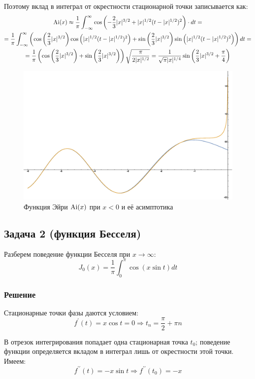 \documentclass[a4paper,12pt]{article}
\begin{document}
\noindent
Поэтому вклад в интеграл от окрестности стационарной точки записывается
как:
\begin{multline*}
{\rm Ai}(x)\approx\frac{1}{\pi}\int_{-\infty}^{\infty}\cos\left(-\frac{2}{3}|x|^{3/2}+|x|^{1/2}(t-|x|^{1/2})^{2}\right)\cdot dt=\\
=\frac{1}{\pi}\int_{-\infty}^{\infty}\left(\cos\left(\frac{2}{3}|x|^{3/2}\right)\cos\left(|x|^{1/2}(t-|x|^{1/2})^{2}\right)+\sin\left(\frac{2}{3}|x|^{3/2}\right)\sin\left(|x|^{1/2}(t-|x|^{1/2})^{2}\right)\right)dt=\\
=\frac{1}{\pi}\left(\cos\left(\frac{2}{3}|x|^{3/2}\right)+\sin\left(\frac{2}{3}|x|^{3/2}\right)\right)\sqrt{\frac{\pi}{2|x|^{1/2}}}=\frac{1}{\sqrt{\pi}|x|^{1/4}}\sin\left(\frac{2}{3}|x|^{3/2}+\frac{\pi}{4}\right)
\end{multline*}


\begin{figure}[h]
\caption{Функция Эйри ${\rm Ai}(x)$ при $x<0$ и её асимптотика}
\centering
\includegraphics[width=0.65\columnwidth]{airy.eps}
\end{figure}



\subsection*{Задача 2 (функция Бесселя)}

Разберем поведение функции Бесселя при $x\to\infty$:
\[
J_{0}(x)=\frac{1}{\pi}\int_{0}^{\pi}\cos(x\sin t)dt
\]



\subsubsection*{Решение}

Стационарные точки фазы даются условием:
\[
f^{\prime}(t)=x\cos t=0\Rightarrow t_{n}=\frac{\pi}{2}+\pi n
\]

\noindent
В отрезок интегрирования попадает одна стационарная точка $t_{0}$;
поведение функции определяется вкладом в интеграл лишь от окрестности
этой точки. Имеем:
\[
f^{\prime\prime}(t)=-x\sin t\Rightarrow f^{\prime\prime}(t_{0})=-x
\]
\end{document}
